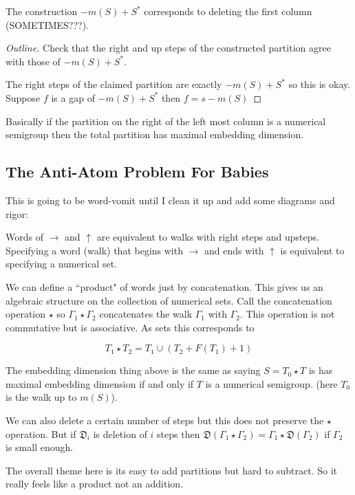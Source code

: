 \begin{claim}
    The construction \(-m(S) + S^*\) corresponds to deleting the first column (SOMETIMES???).
\end{claim}
\begin{proof}[Outline]
    Check that the right and up steps of the constructed partition agree with those of \(-m(S) + S^*\). 

    The right steps of the claimed partition are exactly \(-m(S) + S^*\) so this is okay.
    Suppose \(f\) is a gap of \(-m(S) + S^*\) then \(f = s - m(S)\)
\end{proof}

Basically if the partition on the right of the left most column is a numerical semigroup then the total partition has maximal embedding dimension.

\subsection{The Anti-Atom Problem For Babies}

This is going to be word-vomit until I clean it up and add some diagrams and rigor:

Words of \(\rightarrow\) and \(\uparrow\) are equivalent to walks with right steps and upsteps. Specifying a word (walk) that begins with \(\rightarrow\) and ends with \(\uparrow\) is equivalent to specifying a numerical set.

We can define a ``product" of words just by concatenation. This gives us an algebraic structure on the collection of numerical sets. Call the concatenation operation \(\star\) so \(\Gamma_1 \star \Gamma_2\) concatenates the walk \(\Gamma_1\) with \(\Gamma_2\). This operation is not commutative but is associative. As sets this corresponds to

\[T_1 \star T_2 = T_1 \cup (T_2 + F(T_1) + 1)\]

The embedding dimension thing above is the same as saying \(S = T_0 \star T\) is has maximal embedding dimension if and only if \(T\) is a numerical semigroup. (here \(T_0\) is the walk up to \(m(S)\)).

We can also delete a certain number of steps but this does not preserve the \(\star\) operation. But if \(\mathfrak{D}_i\) is deletion of \(i\) steps then \(\mathfrak{D}(\Gamma_1 \star \Gamma_2) = \Gamma_1 \star \mathfrak{D}(\Gamma_2)\) if \(\Gamma_2\) is small enough.

The overall theme here is its easy to add partitions but hard to subtract. So it really feels like a product not an addition.


